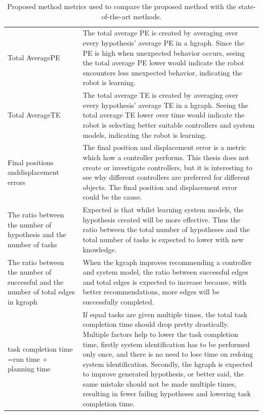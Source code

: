 \noindent
\begin{table}[H]
\centering
\begin{tabular}%
  {>{\raggedright\arraybackslash}p{}%
   >{\raggedright\arraybackslash}p{}}
Total Average\newline \acl{PE} & The total average \ac{PE} is created by averaging over every hypothesis' average \ac{PE} in a \ac{hgraph}. Since the \ac{PE} is high when unexpected behavior occurs, seeing the total average \ac{PE} lower would indicate the robot encounters less unexpected behavior, indicating the robot is learning.\\
Total Average\newline \acl{TE}& The total average \ac{TE} is created by averaging over every hypothesis' average \ac{TE} in a \ac{hgraph}. Seeing the total average \ac{TE} lower over time would indicate the robot is selecting better suitable controllers and system models, indicating the robot is learning.\\
Final positions and\newline displacement errors & The final position and displacement error is a metric which how a controller performs. This thesis does not create or investigate controllers, but it is interesting to see why different controllers are preferred for different objects. The final position and displacement error could be the cause.\\
The ratio between the number of hypothesis and the number of tasks & Expected is that whilst learning system models, the hypothesis created will be more effective. Thus the ratio between the total number of hypotheses and the total number of tasks is expected to lower with new knowledge.\\
The ratio between the number of successful and the number of total edges in \ac{kgraph} & When the \ac{kgraph} improves recommending a controller and system model, the ratio between successful edges and total edges is expected to increase because, with better recommendations, more edges will be successfully completed.\\
task completion time =\newline run time + planning time& If equal tasks are given multiple times, the total task completion time should drop pretty drastically. Multiple factors help to lower the task completion time, firstly system identification has to be performed only once, and there is no need to lose time on redoing system identification. Secondly, the \ac{hgraph} is expected to improve generated hypothesis, or better said, the same mistake should not be made multiple times, resulting in fewer failing hypotheses and lowering task completion time.\\
\end{tabular}
\caption{Proposed method metrics used to compare the proposed method with the state-of-the-art methods.}\label{table:proposed_method_metrics}
\end{table}


